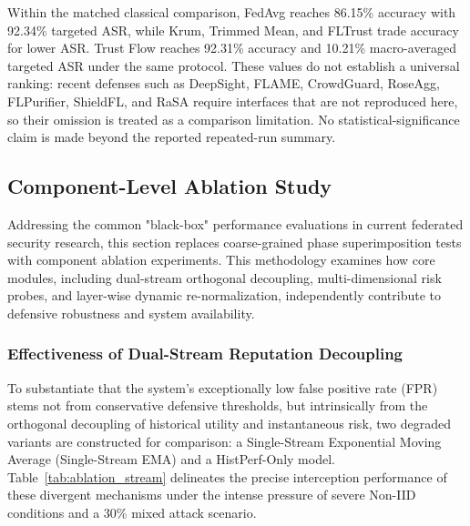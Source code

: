 \documentclass[final,5p,times,twocolumn]{elsarticle/elsarticle}
\begin{document}
Within the matched classical comparison, FedAvg reaches 86.15\% accuracy with 92.34\% targeted ASR, while Krum, Trimmed Mean, and FLTrust trade accuracy for lower ASR. Trust Flow reaches 92.31\% accuracy and 10.21\% macro-averaged targeted ASR under the same protocol. These values do not establish a universal ranking: recent defenses such as DeepSight, FLAME, CrowdGuard, RoseAgg, FLPurifier, ShieldFL, and RaSA require interfaces that are not reproduced here, so their omission is treated as a comparison limitation. No statistical-significance claim is made beyond the reported repeated-run summary.

\subsection{Component-Level Ablation Study}
Addressing the common "black-box" performance evaluations in current federated security research, this section replaces coarse-grained phase superimposition tests with component ablation experiments. This methodology examines how core modules, including dual-stream orthogonal decoupling, multi-dimensional risk probes, and layer-wise dynamic re-normalization, independently contribute to defensive robustness and system availability.

\subsubsection{Effectiveness of Dual-Stream Reputation Decoupling}
To substantiate that the system's exceptionally low false positive rate (FPR) stems not from conservative defensive thresholds, but intrinsically from the orthogonal decoupling of historical utility and instantaneous risk, two degraded variants are constructed for comparison: a Single-Stream Exponential Moving Average (Single-Stream EMA) and a HistPerf-Only model. Table~\ref{tab:ablation_stream} delineates the precise interception performance of these divergent mechanisms under the intense pressure of severe Non-IID conditions and a 30\% mixed attack scenario.
\end{document}

